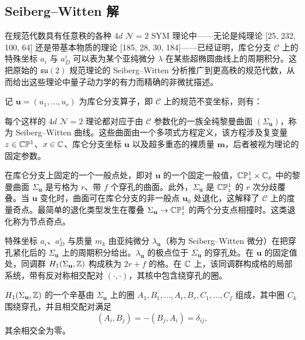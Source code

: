 \subsection{Seiberg–Witten 解}

在规范代数具有任意秩的各种 $4d$ $\mathcal{N}=2$ SYM 理论中——无论是纯理论 [25, 232, 100, 64] 还是带基本物质的理论 [185, 28, 30, 184]——已经证明，库仑分支 $\mathcal{C}$ 上的特殊坐标 $a_i$ 与 $a_D^i$ 可以表为某个亚纯微分 $\lambda$ 在某些超椭圆曲线上的周期积分。这把原始的 $\mathfrak{su}(2)$ 规范理论的 Seiberg–Witten 分析推广到更高秩的规范代数，从而给出这些理论中量子动力学的有力而精确的非微扰描述。

记 $\mathbf{u}=(u_1,\dots,u_r)$ 为库仑分支算子，即 $\mathcal{C}$ 上的规范不变坐标，则有：

\begin{proposition}[20.29]
每个这样的 $4d$ $\mathcal{N}=2$ 理论都对应于由 $\mathcal{C}$ 参数化的一族全纯黎曼曲面 $(\Sigma_{\mathbf{u}})$，称为 Seiberg–Witten 曲线。这些曲面由一个多项式方程定义，该方程涉及复变量 $z\in\mathbb{C}\mathbb{P}^1$、$x\in\mathbb{C}$、库仑分支坐标 $\mathbf{u}$ 以及超多重态的裸质量 $\mathbf{m}$，后者被视为理论的固定参数。
\end{proposition}

在库仑分支上固定的一个一般点处，即对 $\mathbf{u}$ 的一个固定一般值，$\mathbb{C}\mathbb{P}^1_z\times\mathbb{C}_x$ 中的黎曼曲面 $\Sigma_{\mathbf{u}}$ 是亏格为 $r$、带 $f$ 个穿孔的曲面。此外，$\Sigma_{\mathbf{u}}$ 是 $\mathbb{C}\mathbb{P}^1_z$ 的 $r$ 次分歧覆叠。当 $\mathbf{u}$ 变化时，曲面可在库仑分支的非一般点 $\mathbf{u}_0$ 处退化，这解释了 $\mathcal{C}$ 上的度量奇点。最简单的退化类型发生在覆叠 $\Sigma_{\mathbf{u}}\to\mathbb{C}\mathbb{P}^1_z$ 的两个分支点相撞时。这类退化称为节点奇点。

\begin{proposition}[20.30]
特殊坐标 $a_i$、$a_D^i$ 与质量 $m_k$ 由亚纯微分 $\lambda_{\mathbf{u}}$（称为 Seiberg–Witten 微分）在把穿孔紧化后的 $\Sigma_{\mathbf{u}}$ 上的周期积分给出。$\lambda_{\mathbf{u}}$ 的极点位于 $\Sigma_{\mathbf{u}}$ 的穿孔处。在 $\mathbf{u}$ 的固定值处，同调群 $H_1(\Sigma_{\mathbf{u}},\mathbb{Z})$ 构成秩为 $2r+f$ 的格。在 $\mathbb{C}$ 上，该同调群构成格的局部系统，带有反对称相交配对 $(\cdot,\cdot)$，其核中包含绕穿孔的圈。
\end{proposition}

\begin{definition}[20.31]
$H_1(\Sigma_{\mathbf{u}},\mathbb{Z})$ 的一个辛基由 $\Sigma_{\mathbf{u}}$ 上的圈 $A_1,B_1,\dots,A_r,B_r,C_1,\dots,C_f$ 组成，其中圈 $C_k$ 围绕穿孔，并且相交配对满足
\[
(A_i,B_j)=-(B_j,A_i)=\delta_{ij},
\]
其余相交全为零。
\end{definition}

